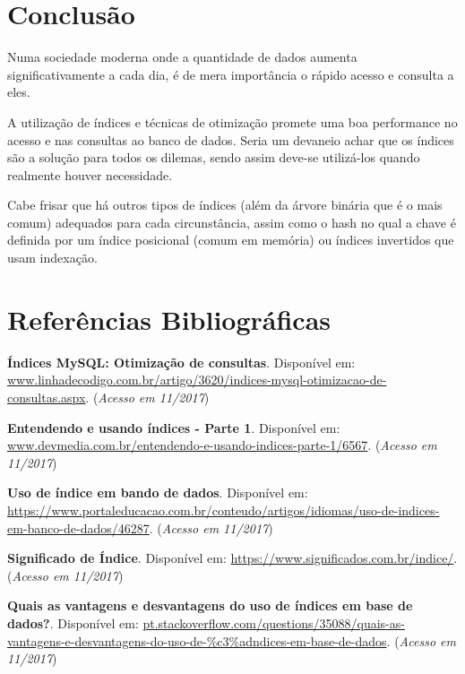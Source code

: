 \documentclass[12pt,a4paper]{article}
\begin{document}
\section{Conclusão}

Numa sociedade moderna onde a quantidade de dados aumenta significativamente a cada dia, é de mera importância o rápido acesso e consulta a eles.

A utilização de índices e técnicas de otimização promete uma boa performance no acesso e nas consultas ao banco de dados. Seria um devaneio achar que os índices são a solução para todos os dilemas, sendo assim deve-se utilizá-los quando realmente houver necessidade.

Cabe frisar que há outros tipos de índices (além da árvore binária que é o mais comum) adequados para cada circunstância, assim como o hash no qual a chave é definida por um índice posicional (comum em memória) ou índices invertidos que usam indexação.

\section{Referências Bibliográficas}
\noindent \textbf{Índices MySQL: Otimização de consultas}. Disponível em: \url {www.linhadecodigo.com.br/artigo/3620/indices-mysql-otimizacao-de-consultas.aspx}. (\textit{Acesso em 11/2017})\\\vspace{0.2cm}

\noindent \textbf{Entendendo e usando índices - Parte 1}. Disponível em: \url {www.devmedia.com.br/entendendo-e-usando-indices-parte-1/6567}. (\textit{Acesso em 11/2017})\\\vspace{0.2cm}

\noindent \textbf{Uso de índice em bando de dados}. Disponível em: \url {https://www.portaleducacao.com.br/conteudo/artigos/idiomas/uso-de-indices-em-banco-de-dados/46287}. (\textit{Acesso em 11/2017})\\\vspace{0.2cm}

\noindent \textbf{Significado de Índice}. Disponível em: \url {https://www.significados.com.br/indice/}. (\textit{Acesso em 11/2017})\\\vspace{0.2cm}

\noindent \textbf{Quais as vantagens e desvantagens do uso de índices em base de dados?}. Disponível em: \url {pt.stackoverflow.com/questions/35088/quais-as-vantagens-e-desvantagens-do-uso-de-\%c3\%adndices-em-base-de-dados}. (\textit{Acesso em 11/2017})
\end{document}
